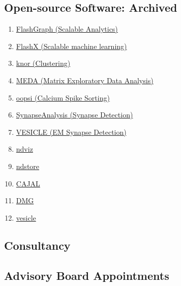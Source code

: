 \documentclass[10pt,colorlinks=true,urlcolor=blue]{moderncv}
\begin{document}
\subsection{Open-source Software: Archived}
\begin{enumerate}
    \item \href{https://github.com/flashxio/FlashX}{FlashGraph (Scalable Analytics)}
    \item \href{https://github.com/flashxio/FlashX}{FlashX (Scalable machine learning)}
    \item \href{https://github.com/flashxio/knorPy}{knor (Clustering)}
    \item \href{https://github.com/neurodata/pymeda}{MEDA (Matrix Exploratory Data Analysis)}
    \item \href{https://github.com/jovo/oopsi}{oopsi (Calcium Spike Sorting)}
    \item \href{https://github.com/aksimhal/SynapseAnalysis}{SynapseAnalysis (Synapse Detection)}
    \item \href{https://github.com/neurodata/vesicle}{VESICLE (EM Synapse Detection)}

    \item \href{https://github.com/neurodata/ndviz}{ndviz}
    \item \href{https://github.com/neurodata/ndstore}{ndstore}
    \item \href{https://github.com/neurodata/CAJAL}{CAJAL}
    \item \href{https://github.com/neurodata/DMG}{DMG}
    \item \href{https://github.com/neurodata/vesicle}{vesicle}

\end{enumerate}



\subsection{Consultancy}

\subsection{Advisory Board Appointments}
\end{document}
